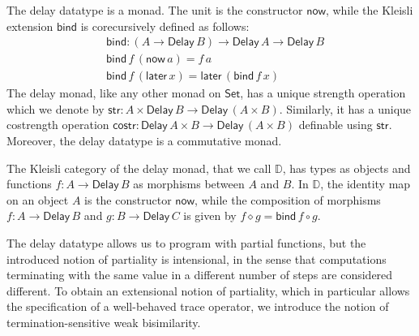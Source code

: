 \documentclass[runningheads,a4paper]{llncs}
\newcommand{\Set}{\mathsf{Set}}
\newcommand{\comp}{\circ}
\newcommand{\Delay}{\ensuremath{\mathsf{Delay}\,}}
\newcommand{\now}{\mathsf{now}}
\newcommand{\later}{\mathsf{later}}
\newcommand{\bind}{\mathsf{bind}}
\newcommand{\str}{\mathsf{str}}
\newcommand{\costr}{\mathsf{costr}}
\newcommand{\D}{\mathbb{D}}
\begin{document}
The delay datatype is a monad. The unit is the constructor $\now$,
while the Kleisli extension $\bind$ is corecursively defined as follows:
\begin{align*}
& \bind : (A \to \Delay B) \to \Delay A \to \Delay B \\
& \bind \,f \, (\now\,a) = f\,a \\
& \bind\,f\,(\later\,x) = \later\,(\bind\,f\,x)
\end{align*}
The delay monad, like any other monad on $\Set$, has a unique strength
operation which we denote by $\str : A \times \Delay B \to \Delay (A
\times B)$. Similarly, it has a unique costrength operation $\costr :
\Delay A \times B \to \Delay (A \times B)$ definable using $\str$. Moreover, the delay datatype is a commutative monad.

The Kleisli category of the delay monad, that we call $\D$, has types
as objects and functions $f : A \to \Delay B$ as morphisms between $A$
and $B$. In $\D$, the identity map on an object $A$ is the constructor
$\now$, while the composition of morphisms $f : A \to \Delay B$ and $g
: B \to \Delay C$ is given by $f \diamond g = \bind\,f \comp g$.

The delay datatype allows us to program with partial functions, but
the introduced notion of partiality is intensional, in the sense that
computations terminating with the same value in a different number of
steps are considered different. To obtain an extensional notion of
partiality, which in particular allows the specification of a
well-behaved trace operator, we introduce the notion of termination-sensitive
weak bisimilarity.
\end{document}
